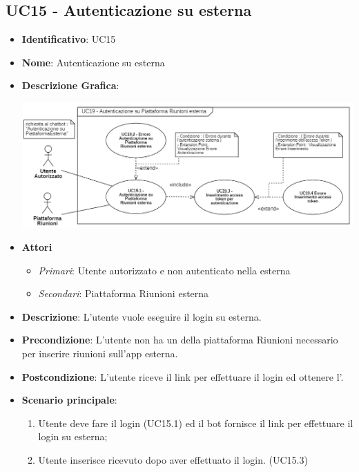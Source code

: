 \subsection{UC15 - Autenticazione su  esterna}
\begin{itemize}
	\item \textbf{Identificativo}: UC15
	\item \textbf{Nome}: Autenticazione su  esterna
	\item\textbf{Descrizione Grafica}: 
	\begin{center}
		\includegraphics[scale=0.65]{images/UC15.png} 
	\end{center}

	\item \textbf{Attori}
	\begin{itemize} 
		\item \textit{Primari}: Utente autorizzato e non autenticato nella  esterna
		\item \textit{Secondari}: Piattaforma Riunioni esterna
	\end{itemize}
	\item \textbf{Descrizione}: L'utente vuole eseguire il login su  esterna.
	\item \textbf{Precondizione}: L'utente non ha un  della piattaforma Riunioni necessario per inserire riunioni sull'app esterna.
	\item \textbf{Postcondizione}: L'utente riceve il link per effettuare il login ed ottenere l'.
	\item \textbf{Scenario principale}: \begin{enumerate}
		\item Utente deve fare il login (UC15.1) ed il bot fornisce il link per effettuare il login su  esterna; 
		\item Utente inserisce  ricevuto dopo aver effettuato il login. (UC15.3)
	\end{enumerate}
\end{itemize}

